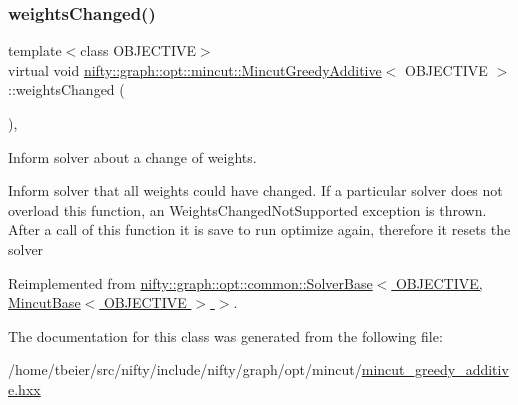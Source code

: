 \mbox{\label{classnifty_1_1graph_1_1opt_1_1mincut_1_1MincutGreedyAdditive_aa7b71928fc3f6e46f5ec99c0119c5787}} 
\subsubsection{\texorpdfstring{weights\+Changed()}{weightsChanged()}}
{\footnotesize\ttfamily template$<$class O\+B\+J\+E\+C\+T\+I\+VE$>$ \\
virtual void \hyperlink{classnifty_1_1graph_1_1opt_1_1mincut_1_1MincutGreedyAdditive}{nifty\+::graph\+::opt\+::mincut\+::\+Mincut\+Greedy\+Additive}$<$ O\+B\+J\+E\+C\+T\+I\+VE $>$\+::weights\+Changed (\begin{DoxyParamCaption}{ }\end{DoxyParamCaption})\hspace{0.3cm}{\ttfamily [inline]}, {\ttfamily [virtual]}}



Inform solver about a change of weights. 

Inform solver that all weights could have changed. If a particular solver does not overload this function, an Weights\+Changed\+Not\+Supported exception is thrown. After a call of this function it is save to run optimize again, therefore it resets the solver 

Reimplemented from \hyperlink{classnifty_1_1graph_1_1opt_1_1common_1_1SolverBase_a6a5d77ee514c4b5f44d1908c1000f0ff}{nifty\+::graph\+::opt\+::common\+::\+Solver\+Base$<$ O\+B\+J\+E\+C\+T\+I\+V\+E, Mincut\+Base$<$ O\+B\+J\+E\+C\+T\+I\+V\+E $>$ $>$}.



The documentation for this class was generated from the following file\+:\begin{DoxyCompactItemize}
\item 
/home/tbeier/src/nifty/include/nifty/graph/opt/mincut/\hyperlink{mincut__greedy__additive_8hxx}{mincut\+\_\+greedy\+\_\+additive.\+hxx}\end{DoxyCompactItemize}

